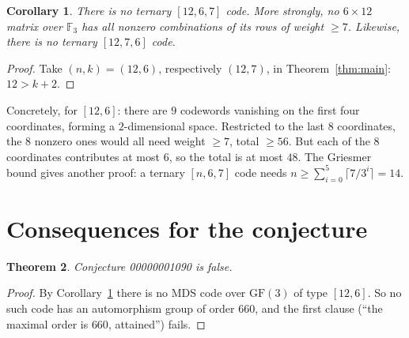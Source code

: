 \documentclass[11pt]{article}
\newtheorem{theorem}{Theorem}
\newtheorem{corollary}[theorem]{Corollary}
\theoremstyle{remark}
\newcommand{\F}{\mathbb{F}_3}
\begin{document}
\begin{corollary}\label{cor:main}
There is no ternary $[12,6,7]$ code. More strongly, no $6\times12$ matrix over
$\F$ has all nonzero combinations of its rows of weight $\ge7$. Likewise, there
is no ternary $[12,7,6]$ code.
\end{corollary}
\begin{proof}
Take $(n,k)=(12,6)$, respectively $(12,7)$, in Theorem~\ref{thm:main}:
$12>k+2$.
\end{proof}

Concretely, for $[12,6]$: there are $9$ codewords vanishing on the first four
coordinates, forming a $2$-dimensional space. Restricted to the last $8$
coordinates, the $8$ nonzero ones would all need weight $\ge7$, total $\ge56$. But
each of the $8$ coordinates contributes at most $6$, so the total is at most $48$.
The Griesmer bound gives another proof: a ternary $[n,6,7]$ code needs
$n\ge\sum_{i=0}^{5}\lceil7/3^i\rceil=14$.

\section{Consequences for the conjecture}\label{sec:readings}
\begin{theorem}
Conjecture 00000001090 is false.
\end{theorem}
\begin{proof}
By Corollary~\ref{cor:main} there is no MDS code over $\mathrm{GF}(3)$ of type
$[12,6]$. So no such code has an automorphism group of order $660$, and the
first clause (``the maximal order is $660$, attained'') fails.
\end{proof}
\end{document}
